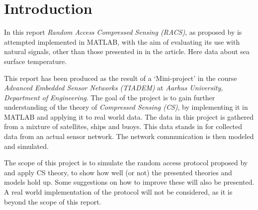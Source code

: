 \documentclass[Main]{subfiles}
\begin{document}
\section{Introduction} %
\label{sec:introduction}
	In this report \emph{Random Access Compressed Sensing (RACS)}, as proposed by \cite{Fazel2011} is attempted implemented in MATLAB, with the aim of evaluating its use with natural signals, other than those presented in in the article.
	Here data about sea surface temperature.

	This report has been produced as the result of a `Mini-project' in the course \emph{Advanced Embedded Sensor Networks (TIADEM)} at \emph{Aarhus University, Department of Engineering}.
	The goal of the project is to gain further understanding of the theory of \emph{Compressed Sensing (CS)}, by implementing it in MATLAB and applying it to real world data.
	The data in this project is gathered from a mixture of satellites, ships and buoys.
	This data stands in for collected data from an actual sensor network.
	The network communication is then modeled and simulated.

	The scope of this project is to simulate the random access protocol proposed by \cite{Fazel2011} and apply CS theory, to show how well (or not) the presented theories and models hold up.
	Some suggestions on how to improve these will also be presented.
	A real world implementation of the protocol will not be considered, as it is beyond the scope of this report.

\end{document}
